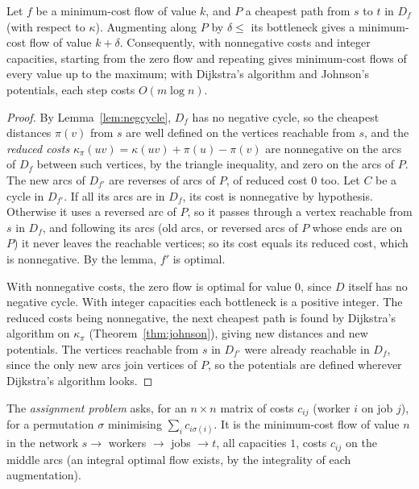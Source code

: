 \begin{theorem}\label{thm:ssp}
Let $f$ be a minimum-cost flow of value $k$, and $P$ a cheapest path from $s$ to $t$ in $D_f$ (with respect to $\kappa$). Augmenting along $P$ by $\delta\le$ its bottleneck gives a minimum-cost flow of value $k+\delta$. Consequently, with nonnegative costs and integer capacities, starting from the zero flow
and repeating gives minimum-cost flows of every value up to the maximum; with Dijkstra's algorithm and Johnson's potentials, each step costs $O(m\log n)$.
\end{theorem}
\begin{proof}
By Lemma~\ref{lem:negcycle}, $D_f$ has no negative cycle, so the cheapest distances $\pi(v)$ from $s$ are well defined on the vertices reachable from $s$, and the \emph{reduced costs} $\kappa_\pi(uv)=\kappa(uv)+\pi(u)-\pi(v)$ are nonnegative on the arcs of $D_f$ between such vertices,
by the triangle inequality, and zero on the arcs of $P$. The new arcs of $D_{f'}$ are reverses of arcs of $P$, of reduced cost $0$ too. Let $C$ be a cycle in $D_{f'}$. If all its arcs are in $D_f$, its cost is nonnegative by hypothesis. Otherwise it uses a reversed arc of $P$, so it passes through
a vertex reachable from $s$ in $D_f$, and following its arcs (old arcs, or reversed arcs of $P$ whose ends are on $P$) it never leaves the reachable vertices; so its cost equals its reduced cost, which is nonnegative. By the lemma, $f'$ is optimal.

With nonnegative costs, the zero flow is optimal for value $0$, since $D$ itself has no negative cycle. With integer capacities each bottleneck is a positive integer. The reduced costs being nonnegative, the next cheapest path is found by Dijkstra's algorithm on $\kappa_\pi$
(Theorem~\ref{thm:johnson}), giving new distances and new potentials. The vertices reachable from $s$ in $D_{f'}$ were already reachable in $D_f$, since the only new arcs join vertices of $P$, so the potentials are
defined wherever Dijkstra's algorithm looks.
\end{proof}

The \emph{assignment problem} asks, for an $n\times n$ matrix of costs $c_{ij}$ (worker $i$ on job $j$), for a permutation $\sigma$ minimising $\sum_ic_{i\sigma(i)}$. It is the minimum-cost flow of value $n$ in the network $s\to$ workers $\to$ jobs $\to t$, all capacities $1$, costs $c_{ij}$ on the middle arcs
(an integral optimal flow exists, by the integrality of each augmentation).


